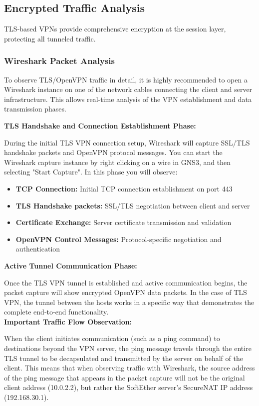 \subsection{Encrypted Traffic Analysis}

TLS-based VPNs provide comprehensive encryption at the session layer, protecting all tunneled traffic.

\subsubsection{Wireshark Packet Analysis}

To observe TLS/OpenVPN traffic in detail, it is highly recommended to open a Wireshark instance on one of the network cables connecting the client and server infrastructure. This allows real-time analysis of the VPN establishment and data transmission phases.

\noindent
\textbf{TLS Handshake and Connection Establishment Phase:}

\noindent
During the initial TLS VPN connection setup, Wireshark will capture SSL/TLS handshake packets and OpenVPN protocol messages. You can start the Wireshark capture instance by right clicking on a wire in GNS3, and then selecting "Start Capture". In this phase you will observe:

\begin{itemize}
    \item \textbf{TCP Connection:} Initial TCP connection establishment on port 443
    \item \textbf{TLS Handshake packets:} SSL/TLS negotiation between client and server
    \item \textbf{Certificate Exchange:} Server certificate transmission and validation
    \item \textbf{OpenVPN Control Messages:} Protocol-specific negotiation and authentication
\end{itemize}

\noindent
\textbf{Active Tunnel Communication Phase:}

\noindent
Once the TLS VPN tunnel is established and active communication begins, the packet capture will show encrypted OpenVPN data packets. In the case of TLS VPN, the tunnel between the hosts works in a specific way that demonstrates the complete end-to-end functionality.\\

\noindent
\textbf{Important Traffic Flow Observation:}

\noindent
When the client initiates communication (such as a ping command) to destinations beyond the VPN server, the ping message travels through the entire TLS tunnel to be decapsulated and transmitted by the server on behalf of the client. This means that when observing traffic with Wireshark, the source address of the ping message that appears in the packet capture will not be the original client address (10.0.2.2), but rather the SoftEther server's SecureNAT IP address (192.168.30.1).

